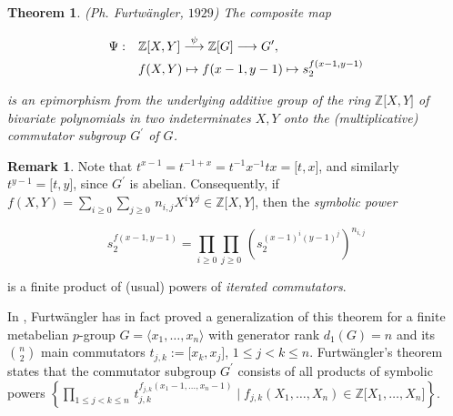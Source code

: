 \documentclass{amsart}
\newtheorem{theorem}{Theorem}[section]
\theoremstyle{definition}
\newtheorem{remark}{Remark}[section]
\numberwithin{equation}{section}
\begin{document}
\begin{theorem}
\label{thm:Furtwaengler}
(Ph. Furtw\"angler, \(1929\))\quad
The composite map

\begin{equation}
\label{eqn:Furtwaengler}
\begin{aligned}
\Psi:\quad & \mathbb{Z}\lbrack X,Y\rbrack \buildrel \psi \over{\longrightarrow} \mathbb{Z}\lbrack G\rbrack \longrightarrow G^\prime,        \\
           & f(X,Y)                       \mapsto         f(x-1,y-1)                 \mapsto         s_2^{f(x-1,y-1)}
\end{aligned}
\end{equation}

\noindent
is an epimorphism
from the underlying additive group of the ring \(\mathbb{Z}\lbrack X,Y\rbrack\) of bivariate polynomials
in two indeterminates \(X,Y\) onto the (multiplicative) commutator subgroup \(G^\prime\) of \(G\).
\end{theorem}

\begin{remark}
\label{rmk:SymbolicPowers}
Note that
\(t^{x-1}=t^{-1+x}=t^{-1}x^{-1}tx=\lbrack t,x\rbrack\), and similarly \(t^{y-1}=\lbrack t,y\rbrack\),
since \(G^\prime\) is abelian.
Consequently, if \(f(X,Y)=\sum_{i\ge 0}\sum_{j\ge 0}\,n_{i,j}X^iY^j\in\mathbb{Z}\lbrack X,Y\rbrack\), then the \textit{symbolic power}

\begin{equation}
\label{eqn:SymbolicPowers}
s_2^{f(x-1,y-1)}=\prod_{i\ge 0}\prod_{j\ge 0}\,\left(s_2^{(x-1)^i(y-1)^j}\right)^{n_{i,j}}
\end{equation}

\noindent
is a finite product of (usual) powers of \textit{iterated commutators}.
\end{remark}

In
\cite{Fw},
Furtw\"angler has in fact proved a generalization of this theorem
for a finite metabelian \(p\)-group \(G=\langle x_1,\ldots,x_n\rangle\) with generator rank \(d_1(G)=n\)
and its \(\binom{n}{2}\) main commutators \(t_{j,k}:=\lbrack x_k,x_j\rbrack\), \(1\le j<k\le n\).
Furtw\"angler's theorem states that the commutator subgroup \(G^\prime\) consists
of all products of symbolic powers
\(\left\lbrace\prod_{1\le j<k\le n}\,t_{j,k}^{f_{j,k}(x_1-1,\ldots,x_n-1)}\mid f_{j,k}(X_1,\ldots,X_n)\in\mathbb{Z}\lbrack X_1,\ldots,X_n\rbrack\right\rbrace\).
\end{document}
